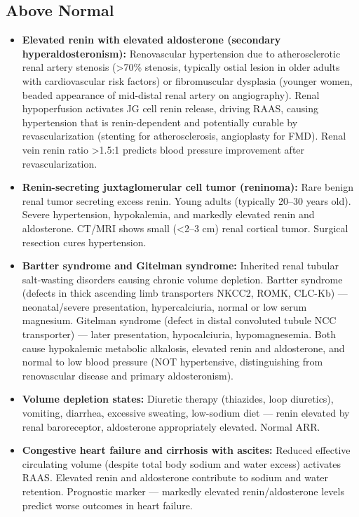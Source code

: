 \subsection*{Above Normal}
\begin{itemize}
  \item \textbf{Elevated renin with elevated aldosterone (secondary hyperaldosteronism):} Renovascular hypertension due to atherosclerotic renal artery stenosis (>70\% stenosis, typically ostial lesion in older adults with cardiovascular risk factors) or fibromuscular dysplasia (younger women, beaded appearance of mid-distal renal artery on angiography). Renal hypoperfusion activates JG cell renin release, driving RAAS, causing hypertension that is renin-dependent and potentially curable by revascularization (stenting for atherosclerosis, angioplasty for FMD). Renal vein renin ratio >1.5:1 predicts blood pressure improvement after revascularization.
  \item \textbf{Renin-secreting juxtaglomerular cell tumor (reninoma):} Rare benign renal tumor secreting excess renin. Young adults (typically 20--30 years old). Severe hypertension, hypokalemia, and markedly elevated renin and aldosterone. CT/MRI shows small (<2--3 cm) renal cortical tumor. Surgical resection cures hypertension.
  \item \textbf{Bartter syndrome and Gitelman syndrome:} Inherited renal tubular salt-wasting disorders causing chronic volume depletion. Bartter syndrome (defects in thick ascending limb transporters NKCC2, ROMK, CLC-Kb) --- neonatal/severe presentation, hypercalciuria, normal or low serum magnesium. Gitelman syndrome (defect in distal convoluted tubule NCC transporter) --- later presentation, hypocalciuria, hypomagnesemia. Both cause hypokalemic metabolic alkalosis, elevated renin and aldosterone, and normal to low blood pressure (NOT hypertensive, distinguishing from renovascular disease and primary aldosteronism).
  \item \textbf{Volume depletion states:} Diuretic therapy (thiazides, loop diuretics), vomiting, diarrhea, excessive sweating, low-sodium diet --- renin elevated by renal baroreceptor, aldosterone appropriately elevated. Normal ARR.
  \item \textbf{Congestive heart failure and cirrhosis with ascites:} Reduced effective circulating volume (despite total body sodium and water excess) activates RAAS. Elevated renin and aldosterone contribute to sodium and water retention. Prognostic marker --- markedly elevated renin/aldosterone levels predict worse outcomes in heart failure.

\end{itemize}
